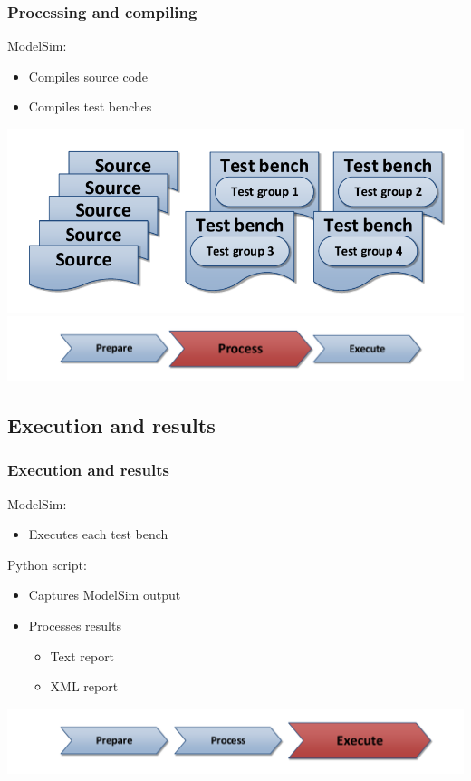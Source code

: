 \documentclass[british,10pt]{beamer}
\begin{document}
\begin{frame}\frametitle{Processing and compiling}
\vskip45pt
ModelSim:
\begin{itemize}
\item Compiles source code
\item Compiles test benches
\end{itemize}
\centering
\includegraphics[width=.8\textwidth]{images/sources.pdf}
\vskip15pt
\includegraphics[width=.7\textwidth]{images/ppe2.pdf}
\end{frame}


\subsection{Execution and results}
\begin{frame}\frametitle{Execution and results}
\vskip48pt
ModelSim:
\begin{itemize}
\item Executes each test bench
\end{itemize}
\vskip5pt
Python script:
\begin{itemize}
\item Captures ModelSim output
\item Processes results
\begin{itemize}
\item Text report
\item XML report
\end{itemize}
\end{itemize}
\centering
\vskip48pt
\includegraphics[width=.7\textwidth]{images/ppe3.pdf}
\end{frame}
\end{document}
